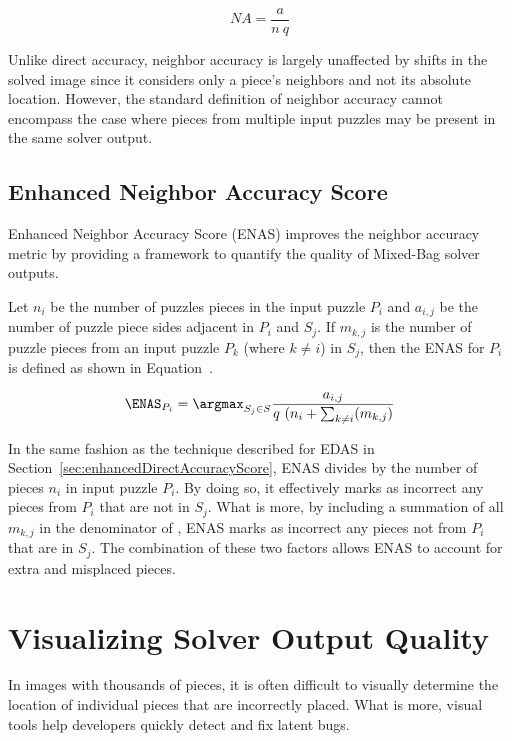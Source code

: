 \begin{equation} \label{eq:neighborAccuracy}
NA = \frac{a}{n~q}
\end{equation}

Unlike direct accuracy, neighbor accuracy is largely unaffected by shifts in the solved image since it considers only a piece's neighbors and not its absolute location.  However, the standard definition of neighbor accuracy cannot encompass the case where pieces from multiple input puzzles may be present in the same solver output.  

\subsection{Enhanced Neighbor Accuracy Score}\label{sec:enhancedNeighborAccuracyScore}

Enhanced Neighbor Accuracy Score (ENAS) improves the neighbor accuracy metric by providing a framework to quantify the quality of Mixed-Bag solver outputs. 

Let $n_i$ be the number of puzzles pieces in the input puzzle $P_i$ and $a_{i,j}$ be the number of puzzle piece sides adjacent in $P_i$ and $S_j$.  If $m_{k,j}$ is the number of puzzle pieces from an input puzzle $P_k$ (where $k \ne i$) in $S_j$, then the ENAS for $P_i$ is defined as shown in Equation~.

\begin{equation} \label{eq:enhancedNeighborAccuracyScore}
\ENAS_{P_i} = \argmax_{S_j \in S}\frac{a_{i,j}}{q ~ (n_i + \sum_{k \ne i}(m_{k,j})}
\end{equation}

In the same fashion as the technique described for EDAS in Section~\ref{sec:enhancedDirectAccuracyScore}, ENAS divides by the number of pieces $n_i$ in input puzzle $P_i$.  By doing so, it effectively marks as incorrect any pieces from $P_i$ that are not in $S_j$.  What is more, by including a summation of all $m_{k,j}$ in the denominator of , ENAS marks as incorrect any pieces not from $P_i$ that are in $S_j$.  The combination of these two factors allows ENAS to account for extra and misplaced pieces.

\section{Visualizing Solver Output Quality}\label{sec:visualizingSolverAccuracy}

In images with thousands of pieces, it is often difficult to visually determine the location of individual pieces that are incorrectly placed.  What is more, visual tools help developers quickly detect and fix latent bugs.

